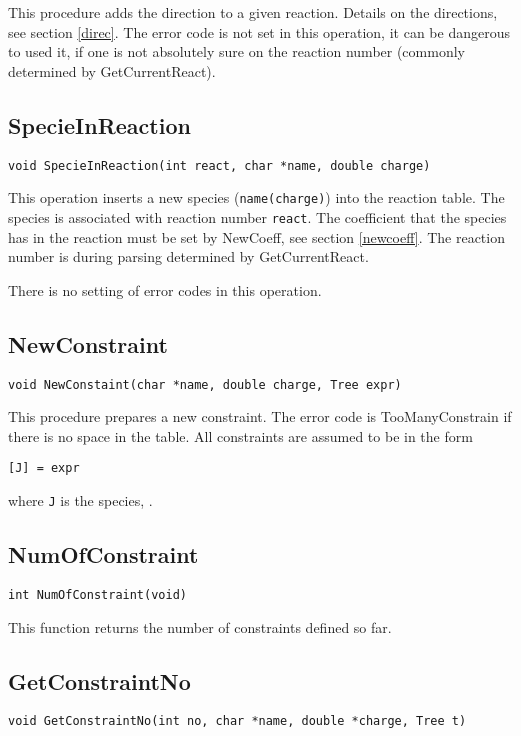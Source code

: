 This procedure adds the direction to a given reaction. Details on the 
directions, see section \ref{direc}. The error code is not set in 
this operation, \ie it can be
dangerous to used it, if one is not absolutely sure on the reaction
number (commonly determined by GetCurrentReact).

\subsection{SpecieInReaction}
\begin{verbatim}
void SpecieInReaction(int react, char *name, double charge)
\end{verbatim}

This operation inserts a new species ({\tt name(charge)}) into the 
reaction table. The species is associated with reaction number 
{\tt react}. The coefficient that the species has in the reaction 
must be set by NewCoeff, see section \ref{newcoeff}. The reaction
number is during parsing determined by GetCurrentReact.

There is no setting of error codes in this operation.  

\subsection{NewConstraint}
\begin{verbatim}
void NewConstaint(char *name, double charge, Tree expr)
\end{verbatim}

This procedure prepares a new constraint. The error code is 
TooManyConstrain if there is no space in the table. All constraints
are assumed to be in the form

\begin{verbatim}
[J] = expr  
\end{verbatim}
where {\tt J} is the species, .

\subsection{NumOfConstraint}
\begin{verbatim}
int NumOfConstraint(void)
\end{verbatim}

This function returns the number of constraints defined so far.

\subsection{GetConstraintNo}
\begin{verbatim}
void GetConstraintNo(int no, char *name, double *charge, Tree t)
\end{verbatim}

